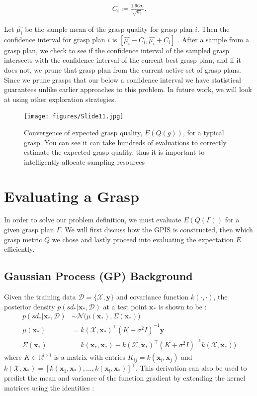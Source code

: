 \documentclass[letterpaper, 10 pt, conference]{ieeeconf}  %
\newcommand{\by}{\mathbf{y}}
\newcommand{\bx}{\mathbf{x}}
\newcommand{\mX}{\mathcal{X}}
\newcommand{\mD}{\mathcal{D}}
\newcommand{\mN}{\mathcal{N}}
\begin{document}
\vspace{-2ex}
\begin{align}
C_{ i} := \frac{1.96 \sigma_i}{\sqrt{n_i}}.
\end{align}

Let $\hat{\mu_i}$ be the sample mean of the grasp quality for grasp plan $i$.
Then the confidence interval for grasp plan $i$ is $[\hat{\mu_i} - C_i, \hat{\mu_i} + C_i]$ \cite{caflisch1998monte}.  
After a sample from a grasp plan, we check to see if the confidence interval of the sampled grasp intersects with the confidence interval of the current best grasp plan, and if it does not, we prune that grasp plan from the current active set of  grasp plans. Since we prune grasps that our below a confidence interval we have statistical guarantees unlike earlier approaches to this problem\cite{kehoe2012toward}. In future work, we will look at using other exploration strategies. 




\begin{figure}[ht!]
\centering
\texttt{[image: figures/Slide11.jpg]}
\caption{ \footnotesize Convergence of expected grasp quality, $E(Q(g))$,  for a typical grasp. You can see it can take hundreds of evaluations to correctly estimate the expected grasp quality, thus it is important to  intelligently allocate sampling resources}
\vspace*{-10pt}
\label{fig:sampling_convergence}
\end{figure} 

\section{Evaluating a Grasp}
 In order to solve our problem definition, we must evaluate $E(Q(\Gamma))$ for a given grasp plan $\Gamma$. We will first discuss how the GPIS is constructed, then which grasp metric $Q$ we chose and lastly proceed into evaluating the expectation $E$ efficiently. 


\subsection{Gaussian Process (GP) Background}
Given the training data $\mD = \{\mX, \by\}$ and covariance function $k(\cdot,\cdot)$, the posterior density $p(sd_*|\bx_*,\mD)$ at a test point $\bx_{*}$ is shown to be \cite{rasmussen2010gaussian}:
\begin{align*}
	p(sd_*|\bx_*,\mD) &\sim \mN\big(\mu(\bx_*), \Sigma(\bx_*)\big) \\
	\mu(\bx_*) &= k(\mX,\bx_*)^{\intercal}(K + \sigma^2I)^{-1}\by \\
	\Sigma(\bx_*) &= k(\bx_*,\bx_*)-k(\mX,\bx_*)^{\intercal}(K+\sigma^2I)^{-1}k(\mX,\bx_*)\big) 
\end{align*}
where $K \in \mathbb{R}^{l \times l}$ is a matrix with entries $K_{ij} = k(\bx_i,\bx_j)$ and $k(\mX,\bx_*) = [k(\bx_1,\bx_*),\ldots,k(\bx_l,\bx_*)]^{\intercal}$. 
This derivation can also be used to predict the mean and variance of the function gradient by extending the kernel matrices using the identities \cite{solak2003derivative}:
\end{document}
